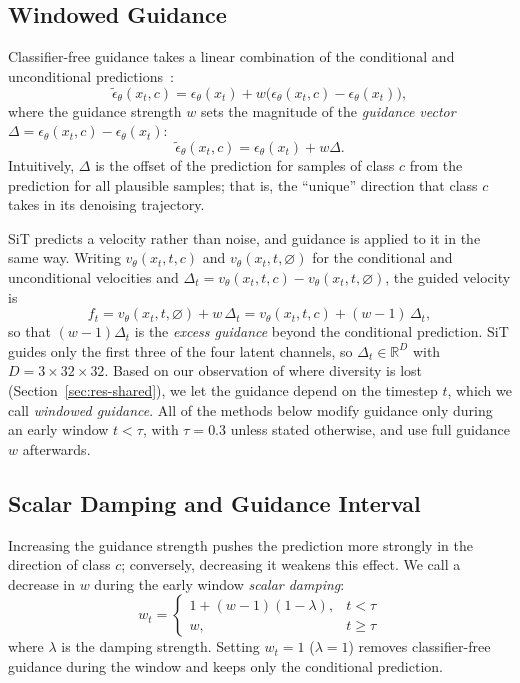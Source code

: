 \documentclass[sigconf,nonacm]{acmart}
\newcommand{\Dt}{\Delta_t}
\begin{document}
\subsection{Windowed Guidance}
\label{sec:windowed}

Classifier-free guidance takes a linear combination of the conditional and unconditional predictions~\cite{ho2022cfg}:
\begin{equation}
  \tilde{\epsilon}_\theta(x_t, c) = \epsilon_\theta(x_t) + w\big(\epsilon_\theta(x_t, c) - \epsilon_\theta(x_t)\big),
  \label{eq:cfg}
\end{equation}
where the guidance strength $w$ sets the magnitude of the \emph{guidance vector} $\Delta = \epsilon_\theta(x_t, c) - \epsilon_\theta(x_t)$:
\begin{equation}
  \tilde{\epsilon}_\theta(x_t, c) = \epsilon_\theta(x_t) + w\Delta .
  \label{eq:cfg-delta}
\end{equation}
Intuitively, $\Delta$ is the offset of the prediction for samples of class $c$ from the prediction for all plausible samples; that is, the ``unique'' direction that class $c$ takes in its denoising trajectory.

SiT predicts a velocity rather than noise, and guidance is applied to it in the same way. Writing $v_\theta(x_t, t, c)$ and $v_\theta(x_t, t, \varnothing)$ for the conditional and unconditional velocities and $\Dt = v_\theta(x_t, t, c) - v_\theta(x_t, t, \varnothing)$, the guided velocity is
\begin{equation}
  f_t = v_\theta(x_t, t, \varnothing) + w\,\Dt = v_\theta(x_t, t, c) + (w-1)\,\Dt ,
  \label{eq:cfg-velocity}
\end{equation}
so that $(w-1)\Dt$ is the \emph{excess guidance} beyond the conditional prediction. SiT guides only the first three of the four latent channels, so $\Dt \in \mathbb{R}^D$ with $D = 3 \times 32 \times 32$. Based on our observation of where diversity is lost (Section~\ref{sec:res-shared}), we let the guidance depend on the timestep $t$, which we call \emph{windowed guidance}. All of the methods below modify guidance only during an early window $t < \tau$, with $\tau = 0.3$ unless stated otherwise, and use full guidance $w$ afterwards.

\subsection{Scalar Damping and Guidance Interval}
\label{sec:scalar}

Increasing the guidance strength pushes the prediction more strongly in the direction of class $c$; conversely, decreasing it weakens this effect. We call a decrease in $w$ during the early window \emph{scalar damping}:
\begin{equation}
  w_t = \begin{cases} 1 + (w-1)(1-\lambda), & t < \tau \\ w, & t \ge \tau \end{cases}
  \label{eq:scalar}
\end{equation}
where $\lambda$ is the damping strength. Setting $w_t = 1$ ($\lambda = 1$) removes classifier-free guidance during the window and keeps only the conditional prediction.
\end{document}
